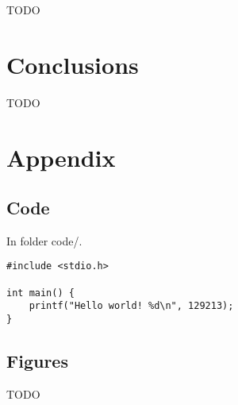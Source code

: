 \documentclass[11pt,a4paper]{article}
\begin{document}
TODO

\section{Conclusions}

TODO

\pagebreak
\appendix
\section{Appendix}

\subsection{Code}

In folder code/.

\begin{lstlisting}
#include <stdio.h>

int main() {
    printf("Hello world! %d\n", 129213);
}
\end{lstlisting}

\subsection{Figures}

TODO
\end{document}

